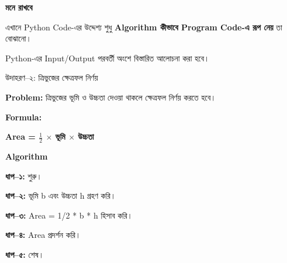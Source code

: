 \begin{rememberbox}

\textbf{\color{deepOrange}মনে রাখবে}

এখানে Python Code-এর উদ্দেশ্য শুধু
\textbf{Algorithm কীভাবে Program Code-এ রূপ নেয়} তা বোঝানো।

Python-এর Input/Output পরবর্তী অংশে বিস্তারিত আলোচনা করা হবে।

\end{rememberbox}

\begin{examplebox}{উদাহরণ–২: ত্রিভুজের ক্ষেত্রফল নির্ণয়}

\textbf{Problem:}
ত্রিভুজের ভূমি ও উচ্চতা দেওয়া থাকলে ক্ষেত্রফল নির্ণয় করতে হবে।

\medskip

\textbf{Formula:}

\begin{center}

\textbf{
Area = \(\frac{1}{2}\) \(\times\) ভূমি \(\times\) উচ্চতা
}

\end{center}

\textbf{\color{darkTeal}Algorithm}

\textbf{ধাপ–১:} শুরু।

\textbf{ধাপ–২:} ভূমি \textenglish{\ttfamily b} এবং
উচ্চতা \textenglish{\ttfamily h} গ্রহণ করি।

\textbf{ধাপ–৩:}
\textenglish{\ttfamily Area = 1/2 * b * h} হিসাব করি।

\textbf{ধাপ–৪:}
\textenglish{\ttfamily Area} প্রদর্শন করি।

\textbf{ধাপ–৫:} শেষ।

\end{examplebox}

